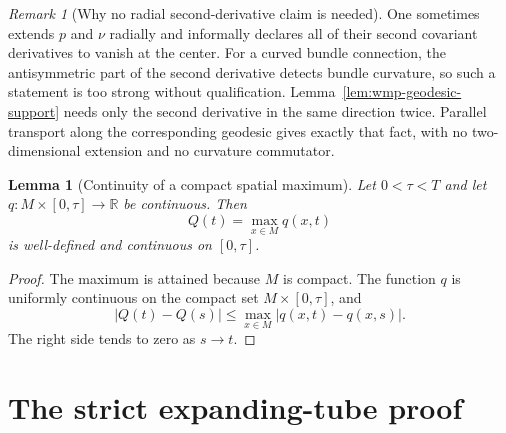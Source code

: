\documentclass[10pt]{coll-l}
\newcommand{\R}{\mathbb{R}}
\newtheorem{lemma}[theorem]{Lemma}
\theoremstyle{definition}
\theoremstyle{remark}
\newtheorem{remark}[theorem]{Remark}
\numberwithin{section}{chapter}
\numberwithin{equation}{chapter}
\begin{document}
\begin{remark}[Why no radial second-derivative claim is needed]
\label{rem:wmp-no-radial-hessian}
One sometimes extends $p$ and $\nu$ radially and informally declares all of
their second covariant derivatives to vanish at the center.  For a curved
bundle connection, the antisymmetric part of the second derivative detects
bundle curvature, so such a statement is too strong without qualification.
Lemma~\ref{lem:wmp-geodesic-support} needs only the second derivative in the
same direction twice.  Parallel transport along the corresponding geodesic
gives exactly that fact, with no two-dimensional extension and no curvature
commutator.
\end{remark}

\begin{lemma}[Continuity of a compact spatial maximum]
\label{lem:wmp-compact-maximum}
Let $0<\tau<T$ and let $q:M\times[0,\tau]\to\R$ be continuous.  Then
\[
       Q(t)=\max_{x\in M}q(x,t)
\]
is well-defined and continuous on $[0,\tau]$.
\end{lemma}

\begin{proof}
The maximum is attained because $M$ is compact.  The function $q$ is
uniformly continuous on the compact set $M\times[0,\tau]$, and
\[
 |Q(t)-Q(s)|
    \leq\max_{x\in M}|q(x,t)-q(x,s)|.
\]
The right side tends to zero as $s\to t$.
\end{proof}

\section{The strict expanding-tube proof}
\label{sec:wmp-proof}
\end{document}
